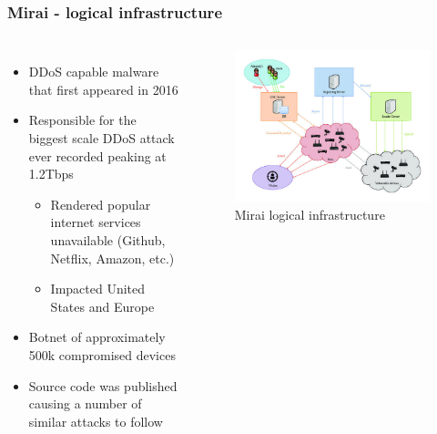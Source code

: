 \documentclass[10pt, presentation]{beamer}
\begin{document}
    \begin{frame}
        \frametitle{Mirai - logical infrastructure}
        \begin{columns}
            \begin{itemize}
                \item DDoS capable malware that first appeared in 2016
                \item Responsible for the biggest scale DDoS attack ever recorded peaking at 1.2Tbps \cite{article:8}
                \begin{itemize}
                    \item Rendered popular internet services unavailable (Github, Netflix, Amazon, etc.)
                    \item Impacted United States and Europe
                \end{itemize}
                \item Botnet of approximately 500k compromised devices
                \item Source code was published causing a number of similar attacks to follow
            \end{itemize}
            \begin{figure}
                \centerline{\includegraphics[scale=0.28,keepaspectratio]{figures/Mirai-logical-infrastructure.png}}
                \caption{Mirai logical infrastructure \cite{article:8}}
            \end{figure}
        \end{columns}


    \end{frame}
\end{document}
